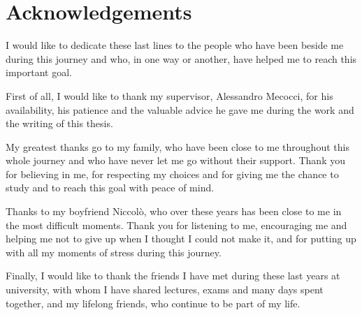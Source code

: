 \chapter*{Acknowledgements}

I would like to dedicate these last lines to the people who have been beside me during this journey and who, in one way or another, have helped me to reach this important goal.

First of all, I would like to thank my supervisor, Alessandro Mecocci, for his availability, his patience and the valuable advice he gave me during the work and the writing of this thesis.

My greatest thanks go to my family, who have been close to me throughout this whole journey and who have never let me go without their support. Thank you for believing in me, for respecting my choices and for giving me the chance to study and to reach this goal with peace of mind.

Thanks to my boyfriend Niccolò, who over these years has been close to me in the most difficult moments. Thank you for listening to me, encouraging me and helping me not to give up when I thought I could not make it, and for putting up with all my moments of stress during this journey.

Finally, I would like to thank the friends I have met during these last years at university, with whom I have shared lectures, exams and many days spent together, and my lifelong friends, who continue to be part of my life.
